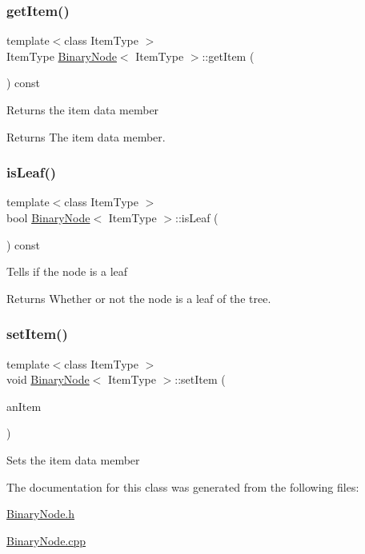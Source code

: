 \subsubsection{\texorpdfstring{get\+Item()}{getItem()}}
{\footnotesize\ttfamily template$<$class Item\+Type $>$ \\
Item\+Type \hyperlink{class_binary_node}{Binary\+Node}$<$ Item\+Type $>$\+::get\+Item (\begin{DoxyParamCaption}{ }\end{DoxyParamCaption}) const}

Returns the item data member \begin{DoxyReturn}{Returns}
The item data member. 
\end{DoxyReturn}
\hypertarget{class_binary_node_a837d4805b46040906b8c5a331e73abee}{}\label{class_binary_node_a837d4805b46040906b8c5a331e73abee} 
\subsubsection{\texorpdfstring{is\+Leaf()}{isLeaf()}}
{\footnotesize\ttfamily template$<$class Item\+Type $>$ \\
bool \hyperlink{class_binary_node}{Binary\+Node}$<$ Item\+Type $>$\+::is\+Leaf (\begin{DoxyParamCaption}{ }\end{DoxyParamCaption}) const}

Tells if the node is a leaf \begin{DoxyReturn}{Returns}
Whether or not the node is a leaf of the tree. 
\end{DoxyReturn}
\hypertarget{class_binary_node_ab731c8cf87040e19ecba80f407b4d9b1}{}\label{class_binary_node_ab731c8cf87040e19ecba80f407b4d9b1} 
\subsubsection{\texorpdfstring{set\+Item()}{setItem()}}
{\footnotesize\ttfamily template$<$class Item\+Type $>$ \\
void \hyperlink{class_binary_node}{Binary\+Node}$<$ Item\+Type $>$\+::set\+Item (\begin{DoxyParamCaption}\item[{const Item\+Type \&}]{an\+Item }\end{DoxyParamCaption})}

Sets the item data member 

The documentation for this class was generated from the following files\+:\begin{DoxyCompactItemize}
\item 
\hyperlink{_binary_node_8h}{Binary\+Node.\+h}\item 
\hyperlink{_binary_node_8cpp}{Binary\+Node.\+cpp}\end{DoxyCompactItemize}
